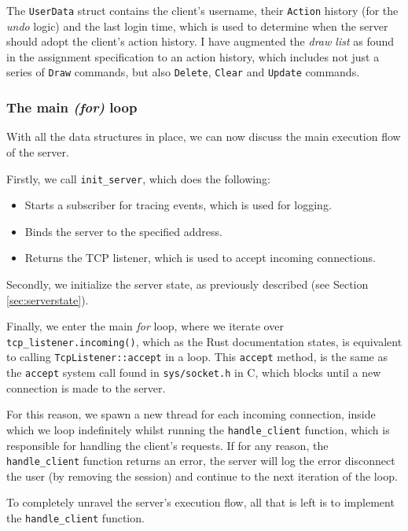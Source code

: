 \documentclass{article}
\newcommand{\code}[1]{\texttt{#1}}
\begin{document}
The \code{UserData} struct contains the client's username, their \code{Action}
history (for the \textit{undo} logic) and the last login time, which is used to
determine when the server should adopt the client's action history. I have
augmented the \textit{draw list} as found in the assignment specification to an
action history, which includes not just a series of \code{Draw} commands, but
also \code{Delete}, \code{Clear} and \code{Update} commands.

\newpage

\subsubsection{The main \textit{(for)} loop}

With all the data structures in place, we can now discuss the main execution
flow of the server.

Firstly, we call \code{init\_server}, which does the following:
\begin{itemize}
    \item Starts a subscriber for tracing events, which is used for logging.
    \item Binds the server to the specified address.
    \item Returns the TCP listener, which is used to accept incoming connections.
\end{itemize}

Secondly, we initialize the server state, as previously described (see Section \ref{sec:serverstate}).

Finally, we enter the main \textit{for} loop, where we iterate over
\code{tcp\_listener.incoming()}, which as the Rust documentation states, is
equivalent to calling \code{TcpListener::accept} in a loop. This \code{accept}
method, is the same as the \code{accept} system call found in
\code{sys/socket.h} in C, which blocks until a new connection is made to the
server.

For this reason, we spawn a new thread for each incoming connection, inside
which we loop indefinitely whilst running the \code{handle\_client} function,
which is responsible for handling the client's requests. If for any reason, the
\code{handle\_client} function returns an error, the server will log the error
disconnect the user (by removing the session) and continue to the next iteration
of the loop.

To completely unravel the server's execution flow, all that is left is to
implement the \code{handle\_client} function.
\end{document}

